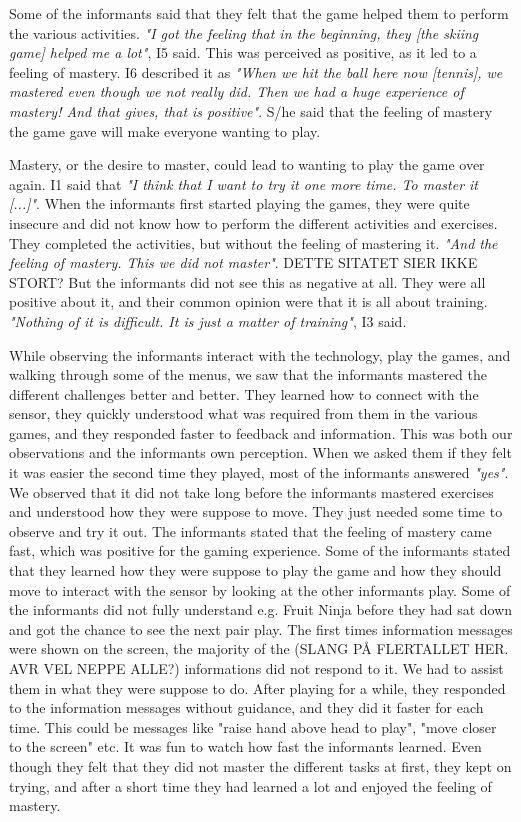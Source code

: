 Some of the informants said that they felt that the game helped them to perform the various activities. \emph{"I got the feeling that in the beginning, they [the skiing game] helped me a lot"}, I5 said. This was perceived as positive, as it led to a feeling of mastery. I6 described it as \emph{"When we hit the ball here now [tennis], we mastered even though we not really did. Then we had a huge experience of mastery! And that gives, that is positive"}. S/he said that the feeling of mastery the game gave will make everyone wanting to play.  

Mastery, or the desire to master, could lead to wanting to play the game over again. I1 said that \emph{"I think that I want to try it one more time. To master it [...]"}. When the informants first started playing the games, they were quite insecure and did not know how to perform the different activities and exercises. They completed the activities, but without the feeling of mastering it. \emph{"And the feeling of mastery. This we did not master"}. DETTE SITATET SIER IKKE STORT? But the informants did not see this as negative at all. They were all positive about it, and their common opinion were that it is all about training. \emph{"Nothing of it is difficult. It is just a matter of training"}, I3 said. 

While observing the informants interact with the technology, play the games, and walking through some of the menus, we saw that the informants mastered the different challenges better and better. They learned how to connect with the sensor, they quickly understood what was required from them in the various games, and they responded faster to feedback and information. This was both our observations and the informants own perception. When we asked them if they felt it was easier the second time they played, most of the informants answered \emph{"yes"}. We observed that it did not take long before the informants mastered exercises and understood how they were suppose to move. They just needed some time to observe and try it out. The informants stated that the feeling of mastery came fast, which was positive for the gaming experience. Some of the informants stated that they learned how they were suppose to play the game and how they should move to interact with the sensor by looking at the other informants play. Some of the informants did not fully understand e.g. Fruit Ninja before they had sat down and got the chance to see the next pair play. The first times information messages were shown on the screen, the majority of the (SLANG PÅ FLERTALLET HER. AVR VEL NEPPE ALLE?) informations did not respond to it. We had to assist them in what they were suppose to do. After playing for a while, they responded to the information messages without guidance, and they did it faster for each time. This could be messages like "raise hand above head to play", "move closer to the screen" etc. It was fun to watch how fast the informants learned. Even though they felt that they did not master the different tasks at first, they kept on trying, and after a short time they had learned a lot and enjoyed the feeling of mastery. 

